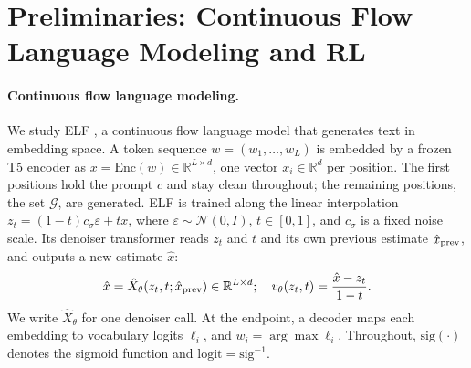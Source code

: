 \section{Preliminaries: Continuous Flow Language Modeling and RL}
\label{sec:estimators}

\paragraph{Continuous flow language modeling.}
We study ELF \citep{hu2026elf}, a continuous flow language model that generates text in embedding space. A token sequence $w=(w_1,\dots,w_L)$ is embedded by a frozen T5 encoder \citep{raffel2020t5} as $x=\mathrm{Enc}(w)\in\mathbb R^{L\times d}$, one vector $x_i\in\mathbb R^d$ per position. The first positions hold the prompt $c$ and stay clean throughout; the remaining positions, the set $\mathcal G$, are generated. ELF is trained along the linear interpolation $z_t=(1-t)c_\sigma\varepsilon+tx$, where
$\varepsilon\sim\mathcal N(0,I)$, $t\in[0,1]$, and $c_\sigma$ is a fixed noise scale. Its denoiser transformer reads $z_t$ and $t$ and its own previous estimate $\hat x_{\rm prev}$, and outputs a new estimate $\hat x$:
\begin{equation}
\hat x=\hat X_\theta(z_t,t;\hat x_{\rm prev})\in\mathbb R^{L\times d}; \quad v_\theta(z_t,t)=\frac{\hat x-z_t}{1-t}.
\label{eq:denoiser}
\end{equation}
We write $\hat X_\theta$ for one denoiser call. At the endpoint, a decoder maps each embedding to vocabulary logits $\ell_i$, and $w_i=\arg\max\ell_i$. Throughout, $\mathrm{sig}(\cdot)$ denotes the sigmoid function and $\mathrm{logit}=\mathrm{sig}^{-1}$.

